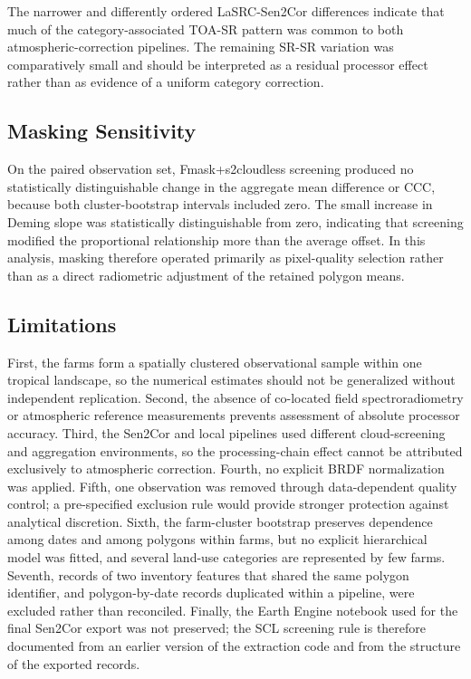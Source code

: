 \documentclass[remotesensing,article,submit,pdftex,oneauthor]{Definitions/mdpi}
\begin{document}
The narrower and differently ordered LaSRC-Sen2Cor differences indicate
that much of the category-associated TOA-SR pattern was common to both
atmospheric-correction pipelines. The remaining SR-SR variation was
comparatively small and should be interpreted as a residual processor
effect rather than as evidence of a uniform category correction.

\subsection{Masking Sensitivity}\label{sec-disc-masking}

On the paired observation set, Fmask+s2cloudless screening produced no
statistically distinguishable change in the aggregate mean difference or
CCC, because both cluster-bootstrap intervals included zero. The small
increase in Deming slope was statistically distinguishable from zero,
indicating that screening modified the proportional relationship more
than the average offset. In this analysis, masking therefore operated
primarily as pixel-quality selection rather than as a direct radiometric
adjustment of the retained polygon means.

\subsection{Limitations}\label{sec-limitations}

First, the farms form a spatially clustered observational sample within
one tropical landscape, so the numerical estimates should not be
generalized without independent replication. Second, the absence of
co-located field spectroradiometry or atmospheric reference measurements
prevents assessment of absolute processor accuracy. Third, the Sen2Cor
and local pipelines used different cloud-screening and aggregation
environments, so the processing-chain effect cannot be attributed
exclusively to atmospheric correction. Fourth, no explicit BRDF
normalization was applied. Fifth, one observation was removed through
data-dependent quality control; a pre-specified exclusion rule would
provide stronger protection against analytical discretion. Sixth, the
farm-cluster bootstrap preserves dependence among dates and among
polygons within farms, but no explicit hierarchical model was fitted,
and several land-use categories are represented by few farms. Seventh,
records of two inventory features that shared the same polygon
identifier, and polygon-by-date records duplicated within a pipeline,
were excluded rather than reconciled. Finally, the Earth Engine notebook
used for the final Sen2Cor export was not preserved; the SCL screening
rule is therefore documented from an earlier version of the extraction
code and from the structure of the exported records.
\end{document}
